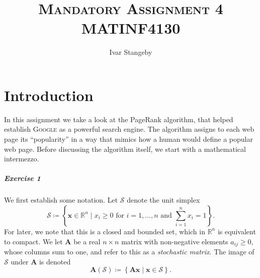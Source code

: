 \documentclass[12pt, oneside, article, a4paper]{memoir}
\title{ \textsc{Mandatory Assignment 4} \\
\textsc{MATINF4130}}
\author{Ivar Stangeby}
\newcommand{\mat}[1]{\bm{#1}}
\begin{document}
\maketitle

\chapter*{Introduction}

In this assignment we take a look at the PageRank algorithm, that helped
establish \textsc{Google} as a powerful search engine.  The algorithm
assigns to each web page its ``popularity'' in a way that mimics how a
human would define a popular web page. Before discussing the algorithm
itself, we start with a mathematical intermezzo.

\paragraph*{Exercise 1}

We first establish some notation. Let \( \mathcal{S} \) denote the unit
simplex 
\begin{equation}
    \mathcal{S} \coloneqq \left\{ \mat{x} \in \mathbb{R}^n \mid x_i \geq
    0 \text{ for  } i = 1, \ldots, n \text{ and } \sum_{i=1}^n x_i =
1\right\}.
\end{equation}
For later, we note that this is a closed and bounded set, which in \(
\mathbb{R}^n\) is equivalent to compact. We let \( \mat{A} \) be a real
\( n \times n \) matrix with non-negative elements \( a_{ij} \geq 0 \),
whose columns sum to one, and refer to this as a \emph{stochastic
matrix}.  The image of \( \mathcal{S} \) under \( \mat{A} \) is denoted
\begin{equation}
    \mat{A}(\mathcal{S}) \coloneqq  \left\{ \mat{Ax} \mid \mat{x} \in
    \mathcal{S} \right\}.
\end{equation}
\end{document}
